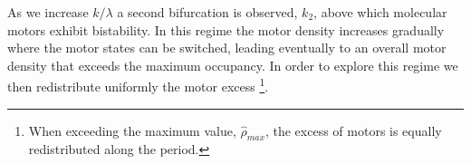 \documentclass[prl,aps,twocolumn, floatfix, superscriptaddress,showpacs]{revtex4}
\begin{document}
As we increase $k/\lambda$ a second bifurcation is observed,  $k_2$, above which molecular motors exhibit bistability. In this regime the motor density increases gradually  where the  motor states can be switched, leading eventually to  an overall motor density that  exceeds the maximum occupancy. 
In order to explore this regime we then  redistribute uniformly the motor excess 
\footnote{When exceeding the maximum value, $\hat\rho_{max}$, the excess of motors is equally redistributed along the period.}.%
\end{document}
